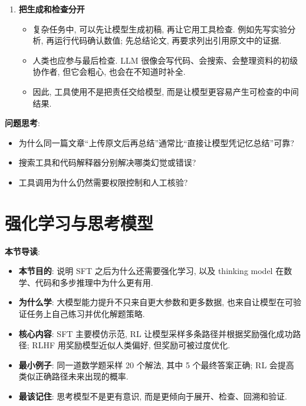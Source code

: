 \documentclass{../nndlcourse}
\begin{document}
\begin{enumerate}
\begin{itemize}
      \item 工具结果也需要被解释和核验. 模型可能选错查询、漏读来源、误解图表, 或在自然语言总结时说错自己代码变量的含义.
    \end{itemize}
  \item \textbf{把生成和检查分开}
    \begin{itemize}
      \item 复杂任务中, 可以先让模型生成初稿, 再让它用工具检查. 例如先写实验分析, 再运行代码确认数值; 先总结论文, 再要求列出引用原文中的证据.
      \item 人类也应参与最后检查. LLM 很像会写代码、会搜索、会整理资料的初级协作者, 但它会粗心, 也会在不知道时补全.
      \item 因此, 工具使用不是把责任交给模型, 而是让模型更容易产生可检查的中间结果.
    \end{itemize}
\end{enumerate}

\textbf{问题思考}:
\begin{itemize}
  \item 为什么同一篇文章“上传原文后再总结”通常比“直接让模型凭记忆总结”可靠?
  \item 搜索工具和代码解释器分别解决哪类幻觉或错误?
  \item 工具调用为什么仍然需要权限控制和人工核验?
\end{itemize}

\section{强化学习与思考模型}

\textbf{本节导读}:
\begin{itemize}
  \item \textbf{本节目的}: 说明 SFT 之后为什么还需要强化学习, 以及 thinking model 在数学、代码和多步推理中为什么更有用.
  \item \textbf{为什么学}: 大模型能力提升不只来自更大参数和更多数据, 也来自让模型在可验证任务上自己练习并优化解题策略.
  \item \textbf{核心内容}: SFT 主要模仿示范, RL 让模型采样多条路径并根据奖励强化成功路径; RLHF 用奖励模型近似人类偏好, 但奖励可被过度优化.
  \item \textbf{最小例子}: 同一道数学题采样 20 个解法, 其中 5 个最终答案正确; RL 会提高类似正确路径未来出现的概率.
  \item \textbf{最该记住}: 思考模型不是更有意识, 而是更倾向于展开、检查、回溯和验证.
\end{itemize}
\end{document}
